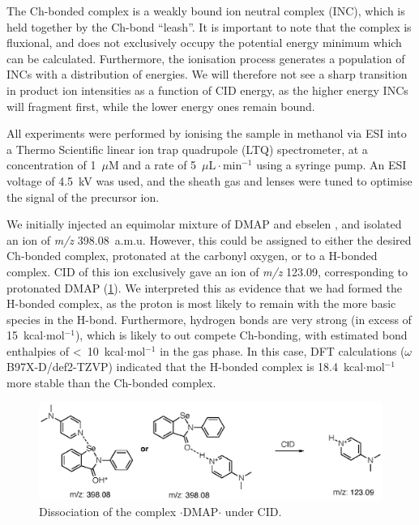 \begin{refsection}
The Ch-bonded complex is a weakly bound ion neutral complex (INC), which is held together by the Ch-bond ``leash''.\autocite{McAdoo1993}
It is important to note that the complex is fluxional, and does not exclusively occupy the potential energy minimum which can be calculated.
Furthermore, the ionisation process generates a population of INCs with a distribution of energies.
We will therefore not see a sharp transition in product ion intensities as a function of CID energy, as the higher energy INCs will fragment first, while the lower energy ones remain bound.

All experiments were performed by ionising the sample in methanol via ESI into a Thermo Scientific linear ion trap quadrupole (LTQ) spectrometer, at a concentration of 1~$\mu$M and a rate of 5~$\mu\text{L}\cdot\text{min}^{-1}$ using a syringe pump.
An ESI voltage of 4.5~kV was used, and the sheath gas and lenses were tuned to optimise the signal of the precursor ion.

We initially injected an equimolar mixture of DMAP and ebselen , and isolated an ion of \textit{m/z} 398.08~a.m.u.
However, this could be assigned to either the desired Ch-bonded complex, protonated at the carbonyl oxygen, or to a H-bonded complex.
CID of this ion exclusively gave an ion of \textit{m/z} 123.09, corresponding to protonated DMAP (\cref{fig:pos-esi-ms}).
We interpreted this as evidence that we had formed the H-bonded complex, as the proton is most likely to remain with the more basic species in the H-bond.
Furthermore,  hydrogen bonds are very strong (in excess of 15~kcal$\cdot$mol$^{-1}$)\autocite{Emsley1980}, which is likely to out compete Ch-bonding, with estimated bond enthalpies of <~10~kcal$\cdot$mol$^{-1}$ in the gas phase.
In this case, DFT calculations ($\omega$B97X-D/def2-TZVP) indicated that the H-bonded complex is 18.4~kcal$\cdot$mol$^{-1}$ more stable than the Ch-bonded complex.


\begin{figure}
    \centering
    \includegraphics[scale=0.74]{Figures/pos-esi-ms.eps}
    \caption[Positive mode ESI of $ \cdot $DMAP$ \cdot $.]{Dissociation of the complex $ \cdot $DMAP$ \cdot $ under CID.}\label{fig:pos-esi-ms}
\end{figure}


\end{refsection}
